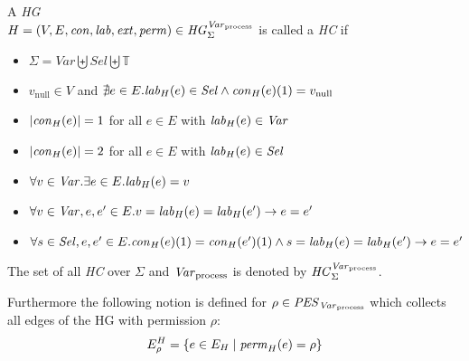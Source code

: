 	\begin{definition}
		A \emph{\acl{HG}}\\
		$H = (V, E, \mathit{con}, \mathit{lab}, \mathit{ext}, \mathit{perm}) \in
		\mathit{HG}_{\Sigma}^{\mathit{Var}_{\text{process}}}$ is called a \emph{\acl{HC}} if
		\begin{itemize}
			\item $\Sigma = \mathit{Var}\biguplus\mathit{Sel}\biguplus \mathbb{T}$
			\item $v_{\text{null}}\in V$ and
				$\nexists e\in E.\mathit{lab}_{H}(e)\in\mathit{Sel}\land
				\mathit{con}_{H}(e)(1)=v_{\text{null}}$
			\item $|\mathit{con}_{H}(e)| = 1$ for all $e\in E$ with $\mathit{lab}_{H}(e)\in
				\mathit{Var}$
			\item $|\mathit{con}_{H}(e)| = 2$ for all $e\in E$ with $\mathit{lab}_{H}(e)\in
				\mathit{Sel}$
			\item $\forall v\in\mathit{Var}.\exists e\in E. \mathit{lab}_{H}(e) = v$
			\item $\forall v\in\mathit{Var}, e,e'\in E.
				v = \mathit{lab}_{H}(e) = \mathit{lab}_{H}(e') \rightarrow e = e'$
			\item $\forall s\in\mathit{Sel}, e,e'\in E.
				\mathit{con}_{H}(e)(1) = \mathit{con}_{H}(e')(1) \land
				s = \mathit{lab}_{H}(e) = \mathit{lab}_{H}(e') \rightarrow e = e'$
		\end{itemize}
	\end{definition}
	The set of all \emph{\ac{HC}} over $\Sigma$ and
	$\mathit{Var}_{\text{process}}$ is denoted by $\mathit{HC}_{\Sigma}^{\mathit{Var}_{\text{process}}}$.

	Furthermore the following notion is defined for $\rho\in\mathit{PES}_{\mathit{Var}_{\text{process}}}$ which
	collects all edges of the \ac{HG} with permission $\rho$:
	\begin{equation*}
		E^{H}_{\rho} = \{e\in E_{H}\mid\mathit{perm}_{H}(e) = \rho\}
	\end{equation*}
